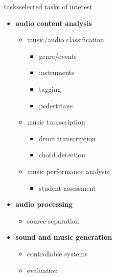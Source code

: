         \begin{frame}{tasks}{selected tasks of interest}
            \vspace{-3mm}
            \begin{itemize}
                \item   \textbf{audio content analysis}
                    \begin{itemize}
                        \item   music/audio classification
                            \begin{itemize}
                                \item genre/events \cite{burred_hierarchical_2004, hung_low-resource_2023}
                                \item instruments \cite{gururani_semi-supervised_2021, chen_music_2023, ding_audio_2023}
                                \item tagging \cite{ding_audio_2023, ding_embedding_2024}
                                \item pedestrians \cite{seshadri_asped_2024}
                            \end{itemize}
                        \item   music transcription
                            \begin{itemize}
                                \item drum transcription \cite{wu_review_2018}
                                \item chord detection \cite{zhou_chord_2015}
                            \end{itemize}
                        \item   music performance analysis
                            \begin{itemize}
                                \item student assessment \cite{pati_assessment_2018}
                            \end{itemize}
                    \end{itemize}
                 \smallskip
                 \item<2->  \textbf{audio processing}
                    \begin{itemize}
                        \item   source separation \cite{hung_multi-task_2020, watcharasupat_generalized_2024}
                    \end{itemize}
                 \smallskip
                 \item<3->  \textbf{sound and music generation}
                    \begin{itemize}
                        \item   controllable systems \cite{pati_attribute-based_2020}
                        \item   evaluation \cite{pati_is_2021, watcharasupat_latte_2022}
                    \end{itemize}
            \end{itemize}
        \end{frame}
        
